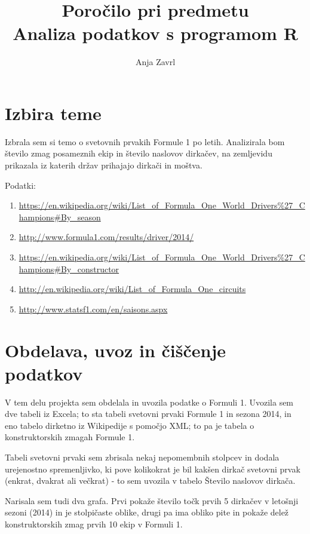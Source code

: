 \documentclass[11pt,a4paper]{article}
\begin{document}
\title{Poročilo pri predmetu \\
Analiza podatkov s programom R}
\author{Anja Zavrl}
\maketitle

\section{Izbira teme}

Izbrala sem si temo o svetovnih prvakih Formule 1 po letih. Analizirala bom število zmag posameznih ekip in število naslovov dirkačev, na zemljevidu prikazala iz katerih držav prihajajo dirkači in moštva.

Podatki: 
\begin{enumerate}
\item \url{https://en.wikipedia.org/wiki/List_of_Formula_One_World_Drivers%27_Champions#By_season}
\item \url{http://www.formula1.com/results/driver/2014/}
\item \url{https://en.wikipedia.org/wiki/List_of_Formula_One_World_Drivers%27_Champions#By_constructor}
\item \url{http://en.wikipedia.org/wiki/List_of_Formula_One_circuits}
\item \url{http://www.statsf1.com/en/saisons.aspx}
\end{enumerate}

\section{Obdelava, uvoz in čiščenje podatkov}

V tem delu projekta sem obdelala in uvozila podatke o Formuli 1. Uvozila sem dve tabeli iz Excela; to sta tabeli
svetovni prvaki Formule 1 in sezona 2014, in eno tabelo dirketno iz Wikipedije s pomočjo XML; to pa je tabela o konstruktorskih zmagah Formule 1. 

Tabeli svetovni prvaki sem zbrisala nekaj nepomembnih stolpcev in dodala urejenostno spremenljivko, ki pove kolikokrat je bil kakšen dirkač svetovni prvak (enkrat, dvakrat ali večkrat) - to sem uvozila v tabelo Število naslovov dirkača.

Narisala sem tudi dva grafa. Prvi pokaže število točk prvih 5 dirkačev v letošnji sezoni (2014) in je stolpičaste oblike, drugi pa ima obliko pite in pokaže delež konstruktorskih zmag prvih 10 ekip v Formuli 1.
\end{document}
